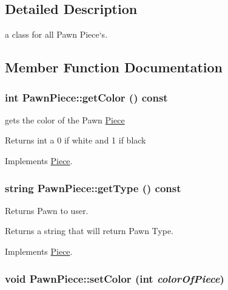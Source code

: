 \subsection{Detailed Description}
a class for all Pawn Piece`s. 

\subsection{Member Function Documentation}
\hypertarget{classPawnPiece_abe56912427ff110820b34223e5f60cda}{
\subsubsection[{getColor}]{\setlength{\rightskip}{0pt plus 5cm}int PawnPiece::getColor () const}}
\label{classPawnPiece_abe56912427ff110820b34223e5f60cda}


gets the color of the Pawn \hyperlink{classPiece}{Piece} \begin{DoxyReturn}{Returns}
int a 0 if white and 1 if black 
\end{DoxyReturn}


Implements \hyperlink{classPiece_a1376072d4815719e60253ce5688df95c}{Piece}.\hypertarget{classPawnPiece_a0a612a59fd7bb512805329902e829ce6}{
\subsubsection[{getType}]{\setlength{\rightskip}{0pt plus 5cm}string PawnPiece::getType () const}}
\label{classPawnPiece_a0a612a59fd7bb512805329902e829ce6}


Returns Pawn to user. \begin{DoxyReturn}{Returns}
a string that will return Pawn Type. 
\end{DoxyReturn}


Implements \hyperlink{classPiece_a5b88fcd786bb30b345b24fbc3ab24ab9}{Piece}.\hypertarget{classPawnPiece_a5cfd7bce3cea8ad32c1b8dc8f5c7b253}{
\subsubsection[{setColor}]{\setlength{\rightskip}{0pt plus 5cm}void PawnPiece::setColor (int {\em colorOfPiece})}}
\label{classPawnPiece_a5cfd7bce3cea8ad32c1b8dc8f5c7b253}


